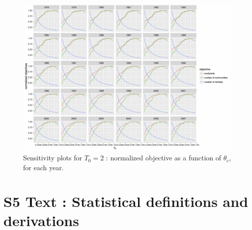 \documentclass[12pt,twoside,a4paper]{article}
\begin{document}
\begin{figure}
\centering
\includegraphics[width=\textheight,height=\textwidth,angle=90]{normalizedObjs-dispth_window3_eth4_1e-5.jpg}
\caption{Sensitivity plots for $T_0 = 2$ : normalized objective as a function of $\theta_c$, for each year.}
\label{fig:sensitivity-window3-3}
\end{figure}








\newpage




\section*{S5 Text : Statistical definitions and derivations}
\end{document}
